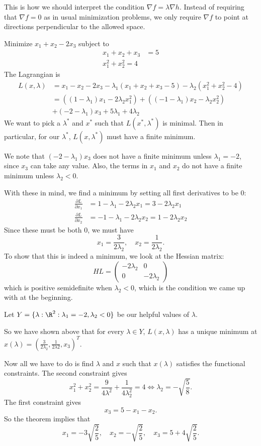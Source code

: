 \documentclass[a4paper]{article}
\begin{document}
This is how we should interpret the condition $\nabla f = \lambda \nabla h$. Instead of requiring that $\nabla f = 0$ as in usual minimization problems, we only require $\nabla f$ to point at directions perpendicular to the allowed space.

\begin{eg}
  Minimize $x_1 + x_2 - 2x_3$ subject to
  \begin{align*}
    x_1 + x_2 + x_3 &= 5\\
    x_1^2 + x_2^2 = 4
  \end{align*}
  The Lagrangian is
  \begin{align*}
    L(x, \lambda) &= x_1 - x_2 - 2x_3 - \lambda_1(x_1 + x_2 + x_3 - 5) - \lambda_2 (x_1^2 + x_2^2 - 4)\\
    &= ((1 - \lambda_1)x_1 - 2\lambda_2 x_1^2) + ((-1 - \lambda_1)x_2 - \lambda_2 x_2^2) \\
    &+ (-2 - \lambda_1)x_3 + 5\lambda_1 + 4\lambda_2
  \end{align*}
  We want to pick a $\lambda^*$ and $x^*$ such that $L(x^*, \lambda^*)$ is minimal. Then in particular, for our $\lambda^*$, $L(x, \lambda^*)$ must have a finite minimum.

  We note that $(-2 - \lambda_1)x_3$ does not have a finite minimum unless $\lambda_1 = -2$, since $x_3$ can take any value. Also, the terms in $x_1$ and $x_2$ do not have a finite minimum unless $\lambda_2 < 0$.

  With these in mind, we find a minimum by setting all first derivatives to be $0$:
  \begin{align*}
    \frac{\partial L}{\partial x_1} &= 1 - \lambda_1 - 2\lambda_2 x_1 = 3 - 2\lambda_2x_1\\
    \frac{\partial L}{\partial x_2} &= -1 - \lambda_1 - 2\lambda_2 x_2 = 1 - 2\lambda_2 x_2
  \end{align*}
  Since these must be both $0$, we must have
  \[
    x_1 = \frac{3}{2\lambda_2}, \quad x_2 = \frac{1}{2\lambda_2}.
  \]
  To show that this is indeed a minimum, we look at the Hessian matrix:
  \[
    HL =
    \begin{pmatrix}
      -2\lambda_2 & 0\\
      0 & -2\lambda_2
    \end{pmatrix}
  \]
  which is positive semidefinite when $\lambda_2 < 0$, which is the condition we came up with at the beginning.

  Let $Y = \{\lambda: \R^2: \lambda_1 = -2, \lambda_2 < 0\}$ be our helpful values of $\lambda$.

  So we have shown above that for every $\lambda \in Y$, $L(x, \lambda)$ has a unique minimum at $x(\lambda) = (\frac{3}{2\lambda_2}, \frac{1}{2\lambda2}, x_3)^T$.

  Now all we have to do is find $\lambda$ and $x$ such that $x(\lambda)$ satisfies the functional constraints. The second constraint gives
  \[
    x_1^2 + x_2^2 = \frac{9}{4\lambda^2} + \frac{1}{4\lambda_2^2} = 4 \Leftrightarrow \lambda_2 = -\sqrt{\frac{5}{8}}.
  \]
  The first constraint gives
  \[
    x_3 = 5 - x_1 - x_2.
  \]
  So the theorem implies that
  \[
    x_1 = -3\sqrt{\frac{2}{5}},\quad x_2 = -\sqrt{\frac{2}{5}},\quad x_3 = 5 + 4\sqrt{\frac{2}{5}}.
  \]
\end{eg}
\end{document}

